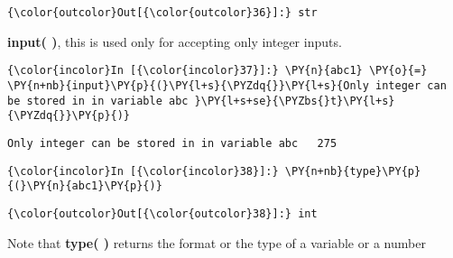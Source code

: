             \begin{Verbatim}[commandchars=\\\{\}]
{\color{outcolor}Out[{\color{outcolor}36}]:} str
\end{Verbatim}
        
    \textbf{input( )}, this is used only for accepting only integer inputs.

    \begin{Verbatim}[commandchars=\\\{\}]
{\color{incolor}In [{\color{incolor}37}]:} \PY{n}{abc1} \PY{o}{=}  \PY{n+nb}{input}\PY{p}{(}\PY{l+s}{\PYZdq{}}\PY{l+s}{Only integer can be stored in in variable abc }\PY{l+s+se}{\PYZbs{}t}\PY{l+s}{\PYZdq{}}\PY{p}{)}
\end{Verbatim}

    \begin{Verbatim}[commandchars=\\\{\}]
Only integer can be stored in in variable abc 	275
    \end{Verbatim}

    \begin{Verbatim}[commandchars=\\\{\}]
{\color{incolor}In [{\color{incolor}38}]:} \PY{n+nb}{type}\PY{p}{(}\PY{n}{abc1}\PY{p}{)}
\end{Verbatim}

            \begin{Verbatim}[commandchars=\\\{\}]
{\color{outcolor}Out[{\color{outcolor}38}]:} int
\end{Verbatim}
        
    Note that \textbf{type( )} returns the format or the type of a variable
or a number


 \newpage   
    
    
    
    

